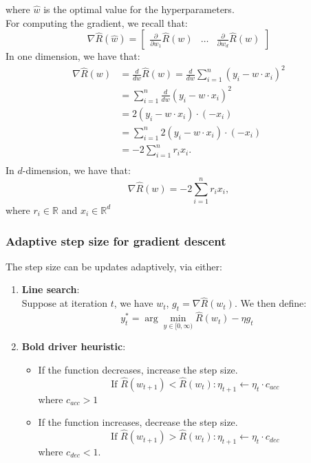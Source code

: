 \documentclass[a4paper,10pt,twoside]{article}
\begin{document}
where $\hat{w}$ is the optimal value for the hyperparameters.\\
For computing the gradient, we recall that:
\begin{equation*}
    \nabla\hat{R}(\hat{w}) =
    \begin{bmatrix}
        \frac{\partial}{\partial w_1}\hat{R}(w) & \ldots & \frac{\partial}{\partial w_d}\hat{R}(w)
    \end{bmatrix}
\end{equation*}
In one dimension, we have that:
\begin{align*}
    \nabla\hat{R}(w) &= \frac{d}{dw}\hat{R}(w) = \frac{d}{dw}\sum_{i=1}^{n}(y_i-w\cdot x_i)^2\\
    &= \sum_{i=1}^{n}\frac{d}{dw}(y_i-w\cdot x_i)^2\\
    &=2(y_i-w\cdot x_i)\cdot(-x_i)\\
    &=\sum_{i=1}^{n}2(y_i-w\cdot x_i)\cdot(-x_i)\\
    &=-2\sum_{i=1}^{n}r_i x_i.\\
\end{align*}
In $d$-dimension, we have that:
\begin{equation*}
    \nabla\hat{R}(w)=-2\sum_{i=1}^{n}r_i x_i,
\end{equation*}
where $r_i\in\mathbb{R}$ and $x_i\in\mathbb{R}^d$

\subsubsection{Adaptive step size for gradient descent}

The step size can be updates adaptively, via either:
\begin{enumerate}
    \item \textbf{Line search}:\\
    Suppose at iteration $t$, we have $w_t$, $g_t=\nabla\hat{R}(w_t)$. We then define:
    \begin{equation*}
        y_t^{*} = \arg\min_{y\in[0,\infty)}\hat{R}(w_t)-\eta g_t
    \end{equation*}
    \item \textbf{Bold driver heuristic}:
    \begin{itemize}
        \item If the function decreases, increase the step size.
        \begin{equation*}
            \text{If }\hat{R}(w_{t+1})<\hat{R}(w_{t}): \eta_{t+1}\leftarrow\eta_{t}\cdot c_{acc}
        \end{equation*}
        where $c_{acc}>1$
        \item If the function increases, decrease the step size.
        \begin{equation*}
            \text{If }\hat{R}(w_{t+1})>\hat{R}(w_{t}): \eta_{t+1}\leftarrow\eta_{t}\cdot c_{dec}
        \end{equation*}
        where $c_{dec}<1$.
    \end{itemize}
\end{enumerate}
\end{document}
